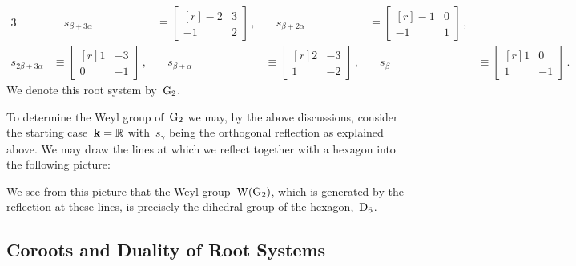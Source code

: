 \begin{example}
\begin{alignat*}{3}
    &
    \quad
    s_{\beta + 3 \alpha}
    &\equiv
    \begin{bmatrix*}[r]
      -2 & 3 \\
      -1 & 2
    \end{bmatrix*} \,,
    &
    \quad
    s_{\beta + 2 \alpha}
    &\equiv
    \begin{bmatrix*}[r]
      -1  & 0 \\
      -1  & 1
    \end{bmatrix*} \,,
  \\
    s_{2 \beta + 3 \alpha}
    &\equiv
    \begin{bmatrix*}[r]
      1 & -3 \\
      0 & -1
    \end{bmatrix*} \,,
    &
    \quad
    s_{\beta + \alpha}
    &\equiv
    \begin{bmatrix*}[r]
      2 & -3 \\
      1 & -2 
    \end{bmatrix*} \,,
    &
    \quad
    s_\beta
    &\equiv
    \begin{bmatrix*}[r]
      1 &  0 \\
      1 & -1
    \end{bmatrix*} \,.
  \end{alignat*}
  We denote this root system by~$\mathrm{G}_2$.
  
  To determine the Weyl group of~$\mathrm{G}_2$ we may, by the above discussions, consider the starting case~$\mathbf{k} = \mathbb{R}$ with~$s_\gamma$ being the orthogonal reflection as explained above.
  We may draw the lines at which we reflect together with a hexagon into the following picture:
  \begin{center}
  \end{center}
  We see from this picture that the Weyl group~$\operatorname{W}(\mathrm{G}_2)$, which is generated by the reflection at these lines, is precisely the dihedral group of the hexagon,~$\mathrm{D}_6$.
\end{example}





\subsection{Coroots and Duality of Root Systems}


